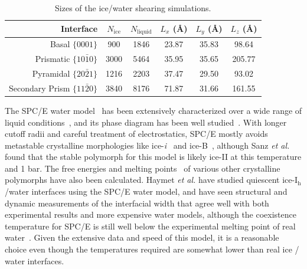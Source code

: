 \begin{table}[h]
\centering
\caption{Sizes of the ice/water shearing simulations. \label{tab:method}}
\begin{tabular}{r|ccccc}
\toprule
 Interface & $N_\mathrm{ice}$ &
 $N_\mathrm{liquid}$ & $L_x$ (\AA) & $L_y$ (\AA) & $L_z$ (\AA) \\
\midrule
Basal  $\{0001\}$                 & 900 & 1846  & 23.87 & 35.83 & 98.64  \\
Prismatic  $\{10\bar{1}0\}$       & 3000 & 5464 & 35.95 & 35.65 & 205.77 \\
Pyramidal  $\{20\bar{2}1\}$       & 1216 & 2203 & 37.47 & 29.50 & 93.02  \\
Secondary Prism  $\{11\bar{2}0\}$ & 3840 & 8176 & 71.87 & 31.66 & 161.55 \\
\bottomrule
\end{tabular}
\end{table}

The SPC/E water model~\cite{Berendsen1987} has been extensively
characterized over a wide range of liquid
conditions~\cite{Arbuckle2002,Kuang2012}, and its phase diagram has
been well studied~\cite{Baez1995,Bryk2004,Sanz2004a,Fennell2005}. With
longer cutoff radii and careful treatment of electrostatics, SPC/E
mostly avoids metastable crystalline morphologies like
ice-\textit{i}~\cite{Fennell2005} and ice-B~\cite{Baez1995}, although
Sanz \textit{et al.} found that the stable polymorph for this model is
likely ice-II at this temperature and 1 bar.\cite{Sanz2004a}  The free energies and
melting
points~\cite{Baez1995,Arbuckle2002,Gay2002,Bryk2002,Bryk2004,Sanz2004a,Fennell2005,GarciaFernandez2006,Abascal2007,Vrbka2007}
of various other crystalline polymorphs have also been calculated.
Haymet \textit{et al.} have studied quiescent ice-I$_\mathrm{h}$/water
interfaces using the SPC/E water model, and have seen structural and
dynamic measurements of the interfacial width that agree well with
both experimental results and more expensive water models, although
the coexistence temperature for SPC/E is still well below the
experimental melting point of real water~\cite{Bryk2002}. Given the
extensive data and speed of this model, it is a reasonable choice even
though the temperatures required are somewhat lower than real ice /
water interfaces.

